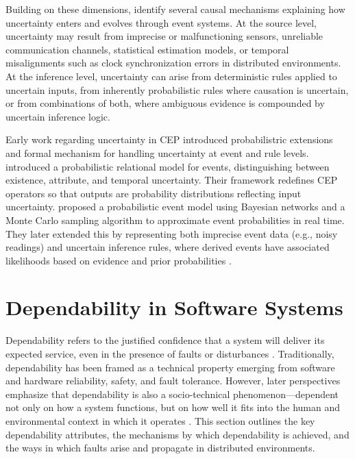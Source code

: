 Building on these dimensions, \citet{wasserkrug2006taxonomy} identify several causal mechanisms explaining how uncertainty enters and evolves through event systems. At the source level, uncertainty may result from imprecise or malfunctioning sensors, unreliable communication channels, statistical estimation models, or temporal misalignments such as clock synchronization errors in distributed environments. At the inference level, uncertainty can arise from deterministic rules applied to uncertain inputs, from inherently probabilistic rules where causation is uncertain, or from combinations of both, where ambiguous evidence is compounded by uncertain inference logic. 


Early work regarding uncertainty in CEP introduced probabilistric extensions and formal mechanism for handling uncertainty at event and rule levels. \citet{re2008event} introduced a probabilistic relational model for events, distinguishing between existence, attribute, and temporal uncertainty. Their framework redefines CEP operators so that outputs are probability distributions reflecting input uncertainty. \citet{wasserkrug2010efficient} proposed a probabilistic event model using Bayesian networks and a Monte Carlo sampling algorithm to approximate event probabilities in real time. They later extended this by representing both imprecise event data (e.g., noisy readings) and uncertain inference rules, where derived events have associated likelihoods based on evidence and prior probabilities \cite{wasserkrug2012model}.





\section{Dependability in Software Systems}\label{sec:background-dependability}

Dependability refers to the justified confidence that a system will deliver its expected service, even in the presence of faults or disturbances \citep{avizienis2004basic}. Traditionally, dependability has been framed as a technical property emerging from software and hardware reliability, safety, and fault tolerance. However, later perspectives emphasize that dependability is also a socio-technical phenomenon—dependent not only on how a system functions, but on how well it fits into the human and environmental context in which it operates \citep{sommerville2007dependable}. This section outlines the key dependability attributes, the mechanisms by which dependability is achieved, and the ways in which faults arise and propagate in distributed environments.

